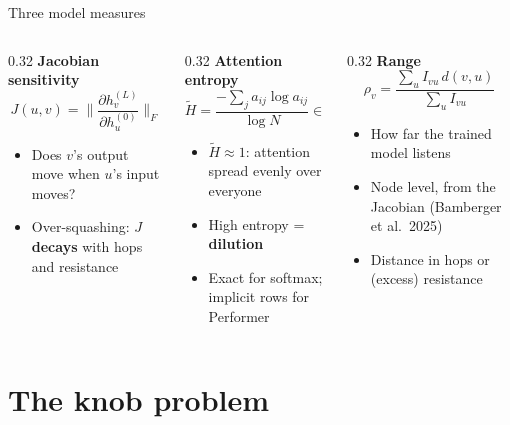 \documentclass[aspectratio=169,10pt]{beamer}
\newcommand{\snote}[1]{{\scriptsize\textcolor{ink!70}{#1}}}
\begin{document}
\begin{frame}{Three model measures}
  \begin{columns}[T]
    \begin{column}{0.32\textwidth}
      \textbf{Jacobian sensitivity}
      \[ J(u,v) = \Big\|\frac{\partial h_v^{(L)}}{\partial h_u^{(0)}}\Big\|_F \]
      \begin{itemize}\small
        \item Does $v$'s output move when $u$'s input moves?
        \item Over-squashing: $J$ \textbf{decays} with hops and resistance
      \end{itemize}
    \end{column}
    \begin{column}{0.32\textwidth}
      \textbf{Attention entropy}
      \[ \tilde H = \frac{-\sum_j a_{ij}\log a_{ij}}{\log N} \in [0,1] \]
      \begin{itemize}\small
        \item $\tilde H \approx 1$: attention spread evenly over everyone
        \item High entropy = \textbf{dilution}
        \item Exact for softmax; implicit rows for Performer
      \end{itemize}
    \end{column}
    \begin{column}{0.32\textwidth}
      \textbf{Range}
      \[ \rho_v = \frac{\sum_u I_{vu}\, d(v,u)}{\sum_u I_{vu}} \]
      \begin{itemize}\small
        \item How far the trained model listens
        \item Node level, from the Jacobian \snote{(Bamberger et al.\ 2025)}
        \item Distance in hops or (excess) resistance
      \end{itemize}
    \end{column}
  \end{columns}
\end{frame}

\section{The knob problem}
\end{document}

